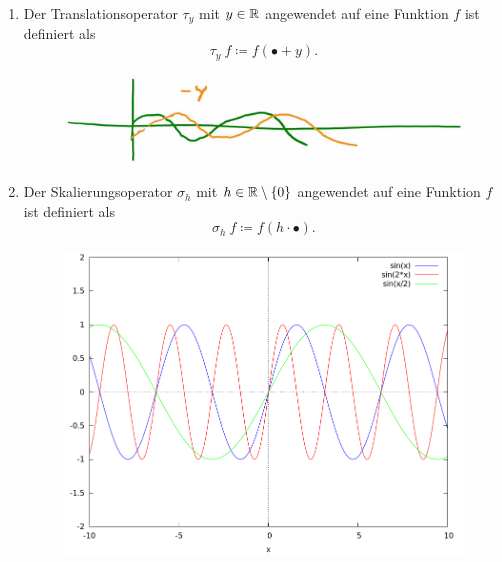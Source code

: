 \begin{definition} \leavevmode
\begin{enumerate}
\item Der Translationsoperator $ \tau_{y} $ mit $ y \in \mathbb{R} $ angewendet auf eine Funktion $ f $ ist 
definiert als
\[ \tau_{y} \ f \coloneqq f(\bullet + y). \]
\begin{figure}[h]
	\centering
	\includegraphics[width=0.5\linewidth]{Bilder/translation}
	\caption{}
	\label{fig:L1}
\end{figure}
\item Der Skalierungsoperator $ \sigma_{h} $ mit $ h \in \mathbb{R} \setminus \{ 0 \} $ angewendet auf eine 
Funktion $ f $ ist definiert als
\[ \sigma_{h} \ f \coloneqq f(h \cdot \bullet). \]
\begin{figure}[h]
	\centering
	\includegraphics[width=0.5\linewidth]{Bilder/Skalierung}
	\caption{}
	\label{fig:L1}
\end{figure}
\end{enumerate}
\end{definition}

